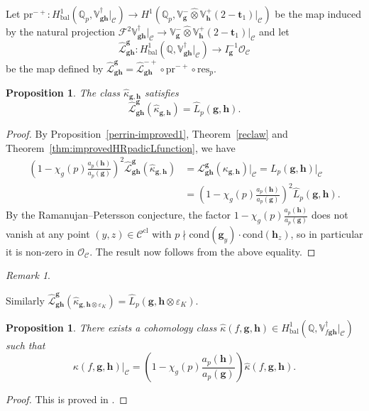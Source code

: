 \documentclass[a4paper,11pt]{amsart}
\theoremstyle{plain}
\newtheorem{propo}[theorem]{Proposition}
\theoremstyle{definition}
\theoremstyle{remark}
\newtheorem{remarkwr}[theorem]{Remark}
\newenvironment{remark}{\begin{remarkwr}\begin{upshape}}{\end{upshape}\end{remarkwr}}
\newcommand{\bb}{\mathbb}
\newcommand{\cl}{\mathcal}
\DeclareMathOperator{\bal}{bal}
\newcommand{\hf}{{\mathbf{f}}}
\newcommand{\hg}{{\mathbf{g}}}
\newcommand{\hh}{{\mathbf h}}
\newcommand{\res}{\mathrm{res}}
\numberwithin{equation}{section}
\begin{document}
Let $\mathrm{pr}^{-+}:H^1_{\bal}(\bb{Q}_p,\bb{V}_{\hg\hh}^\dagger\vert_{\cl{C}})\rightarrow H^1(\bb{Q}_p,\bb{V}_{\hg}^-\hat{\otimes}\bb{V}_\hh^+(2-\mathbf{t}_1)\vert_{\cl{C}})$ be the map induced by the natural projection $\mathscr{F}^2\bb{V}_{\hg\hh}^\dagger\vert_{\cl{C}}\rightarrow \bb{V}_\hg^-\hat{\otimes}\bb{V}_\hh^+(2-\mathbf{t}_1)\vert_{\cl{C}}$ and let
\[
\widehat{\mathcal{L}}_{\hg\hh}^{\hg}:H^1_{\bal}(\bb{Q},\bb{V}_{\hg\hh}^\dagger\vert_{\cl{C}})\longrightarrow I_{\hg}^{-1}\cl{O}_{\cl{C}}
\]
be the map defined by $\widehat{\mathcal{L}}_{\hg\hh}^\hg=\widehat{\mathcal{L}}_{\hg\hh}^{-+}\circ \mathrm{pr}^{-+}\circ \res_p$.

\begin{propo}\label{prop:improvedreclaw1}
    The class $\widehat{\kappa}_{\hg,\hh}$ satisfies
    \[
    \widehat{\cl{L}}_{\hg\hh}^{\hg}(\widehat{\kappa}_{\hg,\hh})=\widehat{L}_p(\hg,\hh).
    \]
\end{propo}
\begin{proof}
   By Proposition~\ref{perrin-improved1}, Theorem~\ref{reclaw} and Theorem~\ref{thm:improvedHRpadicLfunction}, we have
    \begin{align*}
        \left( 1 - \chi_g(p)\frac{a_p(\hh)}{a_p(\hg)} \right)^2  \widehat{\cl{L}}_{\hg\hh}^\hg (\widehat{\kappa}_{\hg,\hh})&=\cl{L}_{\hg\hh}^{\hg}(\kappa_{\hg,\hh})\vert_{\cl{C}}= L_p(\hg,\hh)\vert_{\cl{C}} \\
        &=\left(1-\chi_g(p)\frac{a_p(\hh)}{a_p(\hg)}\right)^2 \widehat{L}_p(\hg,\hh).
    \end{align*}
    By the Ramanujan--Petersson conjecture, the factor $1-\chi_g(p)\frac{a_p(\hh)}{a_p(\hg)}$ does not vanish at any point $(y,z)\in\cl{C}^{\mathrm{cl}}$ with $p\nmid \mathrm{cond}(\hg_y)\cdot \mathrm{cond}(\hh_z)$, so in particular it is non-zero in $\cl{O}_{\cl{C}}$. The result now follows from the above equality. 
\end{proof}

\begin{remark}
    Similarly $\widehat{\cl{L}}_{\hg\hh}^{\hg}(\widehat{\kappa}_{\hg,\hh\otimes\varepsilon_K})=\widehat{L}_p(\hg,\hh\otimes\varepsilon_K)$.
\end{remark}


\begin{propo}\label{prop:improvedtripleproductclass}
There exists a cohomology class $\widehat{\kappa}(f,\hg,\hh)\in H^1_{\bal}(\bb{Q},\bb{V}_{f\hg\hh}^\dagger\vert_{\cl{C}})$ such that
\[
\kappa(f,\hg,\hh)\vert_{\cl{C}} = \left( 1 - \chi_g(p)\frac{a_p(\hh)}{a_p(\hg)} \right) \widehat{\kappa}(f,\hg,\hh).
\]
\end{propo}
\begin{proof}
This is proved in \cite[\S9.3]{BSV}.
\end{proof}
\end{document}
